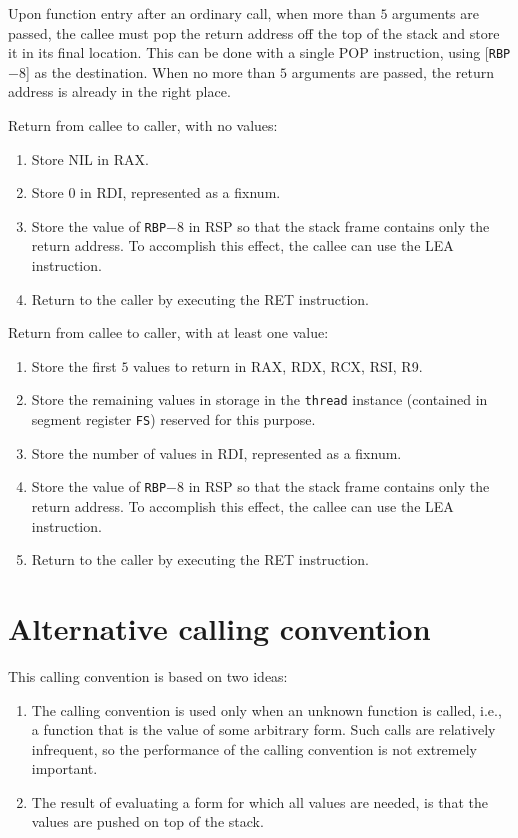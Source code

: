 Upon function entry after an ordinary call, when more than $5$
arguments are passed, the callee must pop the return address off the
top of the stack and store it in its final location.  This can be done
with a single POP instruction, using [\texttt{RBP}$ - 8$] as the
destination.  When no more than $5$ arguments are passed, the return
address is already in the right place.

Return from callee to caller, with no values:

\begin{enumerate}
\item Store NIL in RAX.
\item Store $0$ in RDI, represented as a fixnum.
\item Store the value of \texttt{RBP}$ - 8$ in RSP so that the stack frame
  contains only the return address.  To accomplish this effect, the
  callee can use the LEA instruction.
\item Return to the caller by executing the RET instruction.
\end{enumerate}

Return from callee to caller, with at least one value:

\begin{enumerate}
\item Store the first $5$ values to return in RAX, RDX, RCX, RSI, R9.
\item Store the remaining values in storage in the \texttt{thread}
  instance (contained in segment register \texttt{FS}) reserved for
  this purpose.
\item Store the number of values in RDI, represented as a fixnum.
\item Store the value of \texttt{RBP}$ - 8$ in RSP so that the stack frame
  contains only the return address.  To accomplish this effect, the
  callee can use the LEA instruction.
\item Return to the caller by executing the RET instruction.
\end{enumerate}

\section{Alternative calling convention}

This calling convention is based on two ideas:

\begin{enumerate}
\item The calling convention is used only when an unknown function is
  called, i.e., a function that is the value of some arbitrary form.
  Such calls are relatively infrequent, so the performance of the
  calling convention is not extremely important.
\item The result of evaluating a form for which all values are needed,
  is that the values are pushed on top of the stack.
\end{enumerate}

